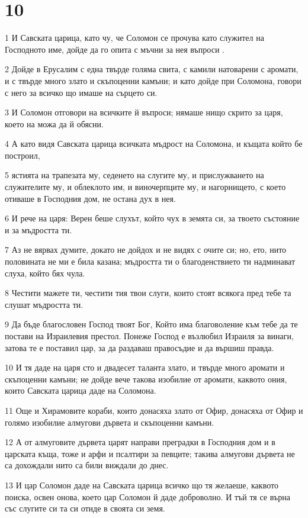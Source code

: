 \chapter{10}

\par 1 И Савската царица, като чу, че Соломон се прочува като служител на Господното име, дойде да го опита с мъчни за нея въпроси .
\par 2 Дойде в Ерусалим с една твърде голяма свита, с камили натоварени с аромати, и с твърде много злато и скъпоценни камъни; и като дойде при Соломона, говори с него за всичко що имаше на сърцето си.
\par 3 И Соломон отговори на всичките й въпроси; нямаше нищо скрито за царя, което на можа да й обясни.
\par 4 А като видя Савската царица всичката мъдрост на Соломона, и къщата който бе построил,
\par 5 ястията на трапезата му, седенето на слугите му, и прислужването на служителите му, и облеклото им, и виночерпците му, и нагорнището, с което отиваше в Господния дом, не остана дух в нея.
\par 6 И рече на царя: Верен беше слухът, който чух в земята си, за твоето състояние и за мъдростта ти.
\par 7 Аз не вярвах думите, докато не дойдох и не видях с очите си; но, ето, нито половината не ми е била казана; мъдростта ти о благоденствието ти надминават слуха, който бях чула.
\par 8 Честити мажете ти, честити тия твои слуги, които стоят всякога пред тебе та слушат мъдростта ти.
\par 9 Да бъде благословен Господ твоят Бог, Който има благоволение към тебе да те постави на Израилевия престол. Понеже Господ е възлюбил Израиля за винаги, затова те е поставил цар, за да раздаваш правосъдие и да вършиш правда.
\par 10 И тя даде на царя сто и двадесет таланта злато, и твърде много аромати и скъпоценни камъни; не дойде вече такова изобилие от аромати, каквото ония, които Савската царица даде на Соломона.
\par 11 Още и Хирамовите кораби, които донасяха злато от Офир, донасяха от Офир и голямо изобилие алмугови дървета и скъпоценни камъни.
\par 12 А от алмуговите дървета царят направи преградки в Господния дом и в царската къща, тоже и арфи и псалтири за певците; такива алмугови дървета не са дохождали нито са били виждали до днес.
\par 13 И цар Соломон даде на Савската царица всичко що тя желаеше, каквото поиска, освен онова, което цар Соломон й даде доброволно. И тъй тя се върна със слугите си та си отиде в своята си земя.
